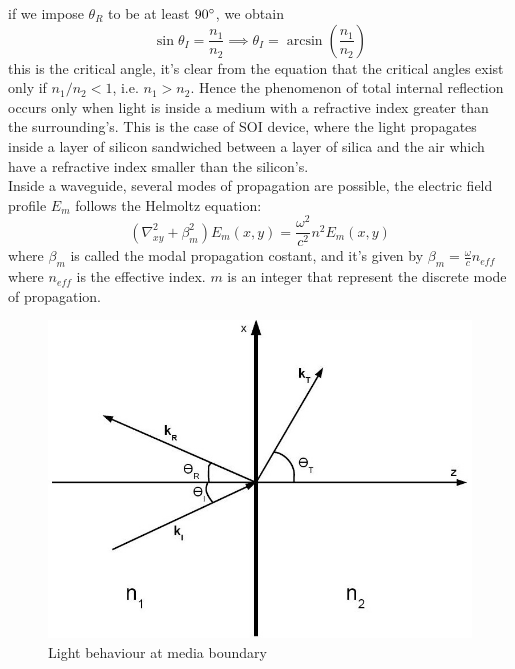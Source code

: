 if we impose $\theta_R$ to be at least $90\degree$, we obtain
\begin{equation}\sin \theta_I = \frac{n_1}{n_2} \implies \theta_I = \arcsin\left(\frac{n_1}{n_2}\right) \end{equation}
this is the critical angle, it's clear from the equation that the critical angles exist only if $n_1/n_2<1$, i.e. $n_1>n_2$. Hence the phenomenon of total internal reflection occurs only when light is inside a medium with a refractive index greater than the surrounding's. This is the case of SOI device, where the light propagates inside a layer of silicon sandwiched between a layer of silica and the air which have a refractive index smaller than the silicon's.\\
Inside a waveguide, several modes of propagation are possible, the electric field profile $E_m$ follows the Helmoltz equation:
\begin{equation}(\nabla_{xy}^2 + \beta_m^2)E_m(x,y)= \frac{\omega^2}{c^2}n^2E_m(x,y)\end{equation}
where $\beta_m$ is called the modal propagation costant, and it's given by $\beta_m = \frac{\omega}{c}n_{eff}$ where $n_{eff}$ is the effective index. $m$ is an integer that represent the discrete mode of propagation.
\begin{figure}
\centering
\includegraphics[width = .5\textwidth]{img/TIRDiagram3}
\caption{Light behaviour at media boundary}
\label{criticalangle}
\end{figure}

